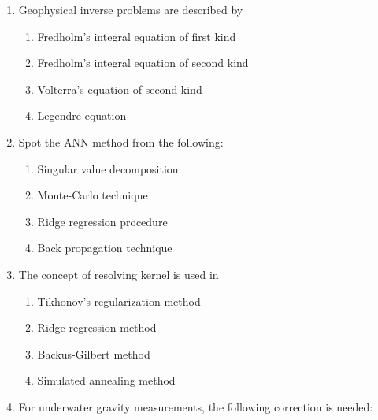 \documentclass[journal,12pt,onecolumn]{IEEEtran}
\theoremstyle{remark}
\begin{document}
\begin{enumerate}[start = 21]
\begin {enumerate}
            \end{enumerate}
    \item Geophysical inverse problems are described by \hfill{} 
            \begin{enumerate}
                \item Fredholm's integral equation of first kind
                \item Fredholm's integral equation of second kind
                \item Volterra's equation of second kind
                \item Legendre equation                
            \end{enumerate}
    \item Spot the ANN method from the following: \hfill{} 
            \begin{enumerate}
                \item Singular value decomposition
                \item Monte-Carlo technique
                \item Ridge regression procedure
                \item Back propagation technique                
            \end{enumerate}
    \item The concept of resolving kernel is used in \hfill{} 
            \begin{enumerate}
                \item Tikhonov's regularization method
                \item Ridge regression method
                \item Backus-Gilbert method
                \item Simulated annealing method                
            \end{enumerate}
    \item For underwater gravity measurements, the following correction is needed: \hfill{} 
            \begin{enumerate}

\end{enumerate}
\end{enumerate}
\end{document}
